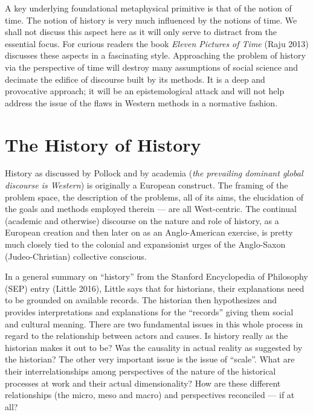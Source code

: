 A key underlying foundational metaphysical primitive is that of the notion of time. The notion of history is very much influenced by the notions of time. We shall not discuss this aspect here as it will only serve to distract from the essential focus. For curious readers the book \textit{Eleven Pictures of Time} (Raju 2013) discusses these aspects in a fascinating style. Approaching the problem of history via the perspective of time will destroy many assumptions of social science and decimate the edifice of discourse built by its methods. It is a deep and provocative approach; it will be an epistemological attack and will not help address the issue of the flaws in Western methods in a normative fashion.


\section*{The History of History}

History as discussed by Pollock and by academia (\textit{the prevailing dominant global discourse is Western}) is originally a European construct. The framing of the problem space, the description of the problems, all of its aims, the elucidation of the goals and methods employed therein — are all West-centric. The continual (academic and otherwise) discourse on the nature and role of history, as a European creation and then later on as an Anglo-American exercise, is pretty much closely tied to the colonial and expansionist urges of the Anglo-Saxon (Judeo-Christian) collective conscious.

In a general summary on “history” from the Stanford Encyclopedia of Philosophy (SEP) entry (Little 2016), Little says that for historians, their explanations need to be grounded on available records. The historian then hypothesizes and provides interpretations and explanations for the “records” giving them social and cultural meaning. There are two fundamental issues in this whole process in regard to the relationship between actors and causes. Is history really as the historian makes it out to be? Was the causality in actual reality as suggested by the historian? The other very important issue is the issue of “scale”. What are their interrelationships among perspectives of the nature of the historical processes at work and their actual dimensionality? How are these different relationships (the micro, meso and macro) and perspectives reconciled — if at all?

